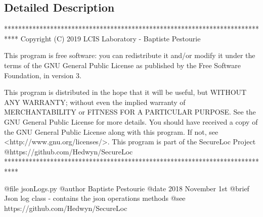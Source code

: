 \subsection{Detailed Description}
\begin{DoxyVerb}****************************************************************************
Copyright (C) 2019 LCIS Laboratory - Baptiste Pestourie

This program is free software: you can redistribute it and/or modify
it under the terms of the GNU General Public License as published by
the Free Software Foundation, in version 3.

This program is distributed in the hope that it will be useful,
but WITHOUT ANY WARRANTY; without even the implied warranty of
MERCHANTABILITY or FITNESS FOR A PARTICULAR PURPOSE. See the
GNU General Public License for more details.
You should have received a copy of the GNU General Public License
along with this program. If not, see <http://www.gnu.org/licenses/>.
This program is part of the SecureLoc Project @https://github.com/Hedwyn/SecureLoc
 ****************************************************************************

@file jsonLogs.py
@author Baptiste Pestourie
@date 2018 November 1st
@brief Json log class - contains the json operations methods
@see https://github.com/Hedwyn/SecureLoc
\end{DoxyVerb}
 